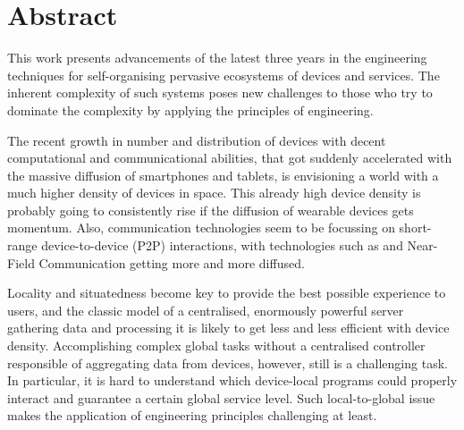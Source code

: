 \documentclass[12pt,a4paper,twoside,openright]{book}
\begin{document}
%
\frontmatter
\maketitle
\pagestyle{plain}

\tableofcontents

\chapter*{\centering Abstract}

This work presents advancements of the latest three years in the engineering techniques for self-organising pervasive ecosystems of devices and services.
%
The inherent complexity of such systems poses new challenges to those who try to dominate the complexity by applying the principles of engineering.

The recent growth in number and distribution of devices with decent computational and communicational abilities, that got suddenly accelerated with the massive diffusion of smartphones and tablets, is envisioning a world with a much higher density of devices in space.
%
This already high device density is probably going to consistently rise if the diffusion of wearable devices gets momentum.
%
Also, communication technologies seem to be focussing on short-range device-to-device (P2P) interactions, with technologies such as \btle{} and Near-Field Communication getting more and more diffused.

Locality and situatedness become key to provide the best possible experience to users, and the classic model of a centralised, enormously powerful server gathering data and processing it is likely to get less and less efficient with device density.
%
Accomplishing complex global tasks without a centralised controller responsible of aggregating data from devices, however, still is a challenging task.
%
In particular, it is hard to understand which device-local programs could properly interact and guarantee a certain global service level.
%
Such local-to-global issue makes the application of engineering principles challenging at least.
\end{document}
